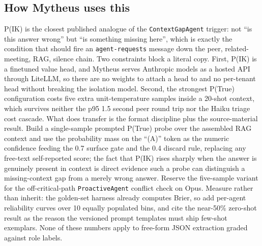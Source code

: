 \subsection{How Mytheus uses this}
\begin{takeaway}
P(IK) is the closest published analogue of the \texttt{ContextGapAgent} trigger: not ``is this answer wrong'' but ``is something missing here'', which is exactly the condition that should fire an \texttt{agent-requests} message down the peer, related-meeting, RAG, silence chain. Two constraints block a literal copy. First, P(IK) is a finetuned value head, and Mytheus serves Anthropic models as a hosted API through LiteLLM, so there are no weights to attach a head to and no per-tenant head without breaking the isolation model. Second, the strongest P(True) configuration costs five extra unit-temperature samples inside a 20-shot context, which survives neither the p95 1.5 second peer round trip nor the Haiku triage cost cascade. What does transfer is the format discipline plus the source-material result. Build a single-sample prompted P(True) probe over the assembled RAG context and use the probability mass on the ``(A)'' token as the numeric confidence feeding the 0.7 surface gate and the 0.4 discard rule, replacing any free-text self-reported score; the fact that P(IK) rises sharply when the answer is genuinely present in context is direct evidence such a probe can distinguish a missing-context gap from a merely wrong answer. Reserve the five-sample variant for the off-critical-path \texttt{ProactiveAgent} conflict check on Opus. Measure rather than inherit: the golden-set harness already computes Brier, so add per-agent reliability curves over 10 equally populated bins, and cite the near-50\% zero-shot result as the reason the versioned prompt templates must ship few-shot exemplars. None of these numbers apply to free-form JSON extraction graded against role labels.
\end{takeaway}


